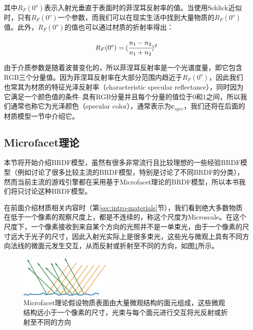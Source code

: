 其中$R_F(0^o)$表示入射光垂直于表面时的菲涅耳反射率的值。当使用Schlick近似时，只有$R_F(0^o)$一个参数，而我们可以在现实生活中找到大量物质的$R_F(0^o)$值。此外，$R_F(0^o)$的值也可以通过材质的折射率得出：

\begin{equation}
	R_F(0^o)=( \cfrac{n_1-n_2}{n_1+n_2})^2
\end{equation}

\noindent 由于介质参数是随着波普变化的，所以菲涅耳反射率是一个光谱度量，即它包含RGB三个分量值。因为菲涅耳反射率在大部分范围内趋近于$R_F(0^o)$，因此我们也常其为材质的特征光泽反射率（characteristic specular reflectance），同时因为它满足一个颜色值的条件--具有RGB分量并且每个分量的值位于0和1之间，所以我们通常也称它为光泽颜色（specular color），通常表示为$\mathbf{c}_{spec}$，我们还将在后面的材质模型一节中介绍它。







\subsection{Microfacet理论}
本节将开始介绍BRDF模型，虽然有很多非常流行且比较理想的一些经验BRDF模型（例如\cite{a:AComparisonofFourBRDFModels,a:ExperimentalAnalysisofBRDFModels,a:AnOverviewofBRDFModels}讨论了很多比较主流的BRDF模型，特别是\cite{a:AnOverviewofBRDFModels}讨论了不同BRDF的分类），然而当前主流的游戏引擎\cite{a:RealShadinginUnrealEngine4,a:MovingFrostbitetoPBR,a:PhysicallyBasedShadingatDisney,a:PhysicallyBasedShadinginUnity}都在采用基于Microfacet理论的BRDF模型，所以本书我们将只讨论这种BRDF模型。

在前面介绍材质相关内容时（第\ref{sec:intro-materials}节），我们看到绝大多数物质在低于一个像素的观察尺度上，都是不连续的，称这个尺度为Microscale。在这个尺度下，一个像素接收到来自某个方向的光照并不是一单束光，由于一个像素的尺寸远大于光子的尺寸，因此入射光实际上是很多束光，这些光与微观上具有不同方向法线的微面元发生交互，从而反射或折射至不同的方向，如图\ref{f:intro-microgeometry}所示。

\begin{figure}
	\sidecaption
	\includegraphics[width=0.4\textwidth]{figures/intro/ray-optics-3}
	\caption{Microfacet理论假设物质表面由大量微观结构的面元组成，这些微观结构远小于一个像素的尺寸，光束与每个面元进行交互将光反射或折射至不同的方向}
	\label{f:intro-microgeometry}
\end{figure}


